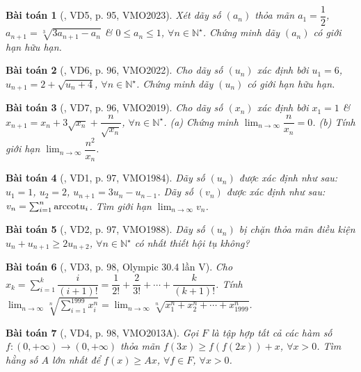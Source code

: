 \documentclass[oneside]{book}
\newtheorem{baitoan}{Bài toán}
\begin{document}
\begin{baitoan}[\cite{Hung_nang_cao_phat_trien_Toan_11_tap_1}, VD5, p. 95, VMO2023]
	Xét dãy số $(a_n)$ thỏa mãn $a_1 = \dfrac{1}{2}$, $a_{n+1} = \sqrt[3]{3a_{n+1} - a_n}$ \& $0\le a_n\le1$, $\forall n\in\mathbb{N}^\star$. Chứng minh dãy $(a_n)$ có giới hạn hữu hạn.
\end{baitoan}

\begin{baitoan}[\cite{Hung_nang_cao_phat_trien_Toan_11_tap_1}, VD6, p. 96, VMO2022]
	Cho dãy số $(u_n)$ xác định bởi $u_1 = 6$, $u_{n+1} = 2 + \sqrt{u_n + 4}$, $\forall n\in\mathbb{N}^\star$.  Chứng minh dãy $(u_n)$ có giới hạn hữu hạn.
\end{baitoan}

\begin{baitoan}[\cite{Hung_nang_cao_phat_trien_Toan_11_tap_1}, VD7, p. 96, VMO2019]
	Cho dãy số $(x_n)$ xác định bởi $x_1 = 1$ \& $x_{n+1} = x_n + 3\sqrt{x_n} + \dfrac{n}{\sqrt{x_n}}$, $\forall n\in\mathbb{N}^\star$. (a) Chứng minh $\lim_{n\to\infty} \dfrac{n}{x_n} = 0$. (b) Tính giới hạn $\lim_{n\to\infty} \dfrac{n^2}{x_n}$.
\end{baitoan}

\begin{baitoan}[\cite{Hung_nang_cao_phat_trien_Toan_11_tap_1}, VD1, p. 97, VMO1984]
	Dãy số $(u_n)$ được xác định như sau: $u_1 = 1$, $u_2 = 2$, $u_{n+1} = 3u_n - u_{n-1}$. Dãy số $(v_n)$ được xác định như sau: $v_n = \sum_{i=1}^n {\rm arccot}u_i$. Tìm giới hạn $\lim_{n\to\infty} v_n$.
\end{baitoan}

\begin{baitoan}[\cite{Hung_nang_cao_phat_trien_Toan_11_tap_1}, VD2, p. 97, VMO1988]
	Dãy số $(u_n)$ bị chặn thỏa mãn điều kiện $u_n + u_{n+1}\ge2u_{n+2}$, $\forall n\in\mathbb{N}^\star$ có nhất thiết hội tụ không?
\end{baitoan}

\begin{baitoan}[\cite{Hung_nang_cao_phat_trien_Toan_11_tap_1}, VD3, p. 98, Olympic 30.4 lần V]
	Cho $x_k = \sum_{i=1}^k \dfrac{i}{(i + 1)!} = \dfrac{1}{2!} + \dfrac{2}{3!} + \cdots + \dfrac{k}{(k + 1)!}$. Tính $\lim_{n\to\infty} \sqrt[n]{\sum_{i=1}^{1999} x_i^n} = \lim_{n\to\infty} \sqrt[n]{x_1^n + x_2^n + \cdots + x_{1999}^n}$.
\end{baitoan}

\begin{baitoan}[\cite{Hung_nang_cao_phat_trien_Toan_11_tap_1}, VD4, p. 98, VMO2013A]
	Gọi $F$ là tập hợp tất cả các hàm số $f:(0,+\infty)\to(0,+\infty)$ thỏa mãn $f(3x)\ge f(f(2x)) + x$, $\forall x > 0$. Tìm hằng số $A$ lớn nhất để $f(x)\ge Ax$, $\forall f\in F$, $\forall x > 0$.
\end{baitoan}
\end{document}
